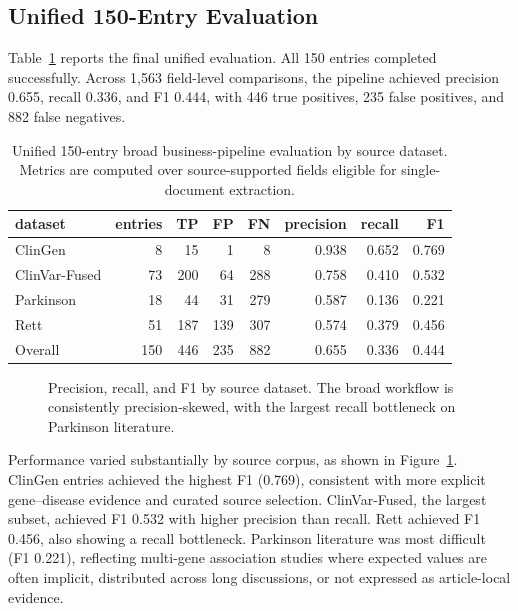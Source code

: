 \documentclass[conference]{IEEEtran}
\newcommand{\bmode}{broad}
\begin{document}
\subsection{Unified 150-Entry Evaluation}
Table~\ref{tab:unified150} reports the final unified evaluation. All 150 entries completed successfully. Across 1,563 field-level comparisons, the pipeline achieved precision 0.655, recall 0.336, and F1 0.444, with 446 true positives, 235 false positives, and 882 false negatives.

\begin{table}[t]
\centering
\caption{Unified 150-entry \bmode{} business-pipeline evaluation by source dataset. Metrics are computed over source-supported fields eligible for single-document extraction.}
\label{tab:unified150}
\setlength{\tabcolsep}{4pt}
\renewcommand{\arraystretch}{1.08}
\footnotesize
\begin{tabular}{lrrrrrrr}
\toprule
dataset & entries & TP & FP & FN & precision & recall & F1 \\
\midrule
ClinGen & 8 & 15 & 1 & 8 & 0.938 & 0.652 & 0.769 \\
ClinVar-Fused & 73 & 200 & 64 & 288 & 0.758 & 0.410 & 0.532 \\
Parkinson & 18 & 44 & 31 & 279 & 0.587 & 0.136 & 0.221 \\
Rett & 51 & 187 & 139 & 307 & 0.574 & 0.379 & 0.456 \\
\midrule
Overall & 150 & 446 & 235 & 882 & 0.655 & 0.336 & 0.444 \\
\bottomrule
\end{tabular}
\end{table}

\begin{figure}[t]
\centering

\caption{Precision, recall, and F1 by source dataset. The broad workflow is consistently precision-skewed, with the largest recall bottleneck on Parkinson literature.}
\label{fig:source-metrics}
\end{figure}

Performance varied substantially by source corpus, as shown in Figure~\ref{fig:source-metrics}. ClinGen entries achieved the highest F1 (0.769), consistent with more explicit gene--disease evidence and curated source selection. ClinVar-Fused, the largest subset, achieved F1 0.532 with higher precision than recall. Rett achieved F1 0.456, also showing a recall bottleneck. Parkinson literature was most difficult (F1 0.221), reflecting multi-gene association studies where expected values are often implicit, distributed across long discussions, or not expressed as article-local evidence.
\end{document}
